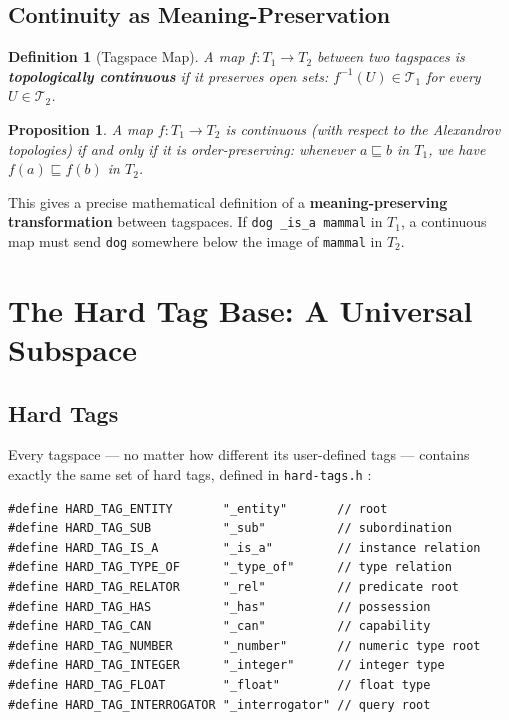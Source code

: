 \documentclass{article}
\newtheorem{definition}{Definition}[section]
\newtheorem{proposition}{Proposition}[section]
\begin{document}
\subsection{Continuity as Meaning-Preservation}

\begin{definition}[Tagspace Map]
A map $f : T_1 \to T_2$ between two tagspaces is \textbf{topologically
continuous} if it preserves open sets: $f^{-1}(U) \in \mathcal{T}_1$ for
every $U \in \mathcal{T}_2$.
\end{definition}

\begin{proposition}
A map $f : T_1 \to T_2$ is continuous (with respect to the Alexandrov
topologies) if and only if it is order-preserving: whenever
$a \sqsubseteq b$ in $T_1$, we have $f(a) \sqsubseteq f(b)$ in $T_2$.
\end{proposition}

This gives a precise mathematical definition of a
\textbf{meaning-preserving transformation} between tagspaces. If
\texttt{dog \_is\_a mammal} in $T_1$, a continuous map must send \texttt{dog}
somewhere below the image of \texttt{mammal} in $T_2$.

\section{The Hard Tag Base: A Universal Subspace}

\subsection{Hard Tags}

Every tagspace --- no matter how different its user-defined tags --- contains
exactly the same set of hard tags, defined in \texttt{hard-tags.h}
\cite{hardtags}:

\begin{lstlisting}[style=cpp, caption={Core hard tag definitions in hard-tags.h}]
#define HARD_TAG_ENTITY       "_entity"       // root
#define HARD_TAG_SUB          "_sub"          // subordination
#define HARD_TAG_IS_A         "_is_a"         // instance relation
#define HARD_TAG_TYPE_OF      "_type_of"      // type relation
#define HARD_TAG_RELATOR      "_rel"          // predicate root
#define HARD_TAG_HAS          "_has"          // possession
#define HARD_TAG_CAN          "_can"          // capability
#define HARD_TAG_NUMBER       "_number"       // numeric type root
#define HARD_TAG_INTEGER      "_integer"      // integer type
#define HARD_TAG_FLOAT        "_float"        // float type
#define HARD_TAG_INTERROGATOR "_interrogator" // query root
\end{lstlisting}
\end{document}
